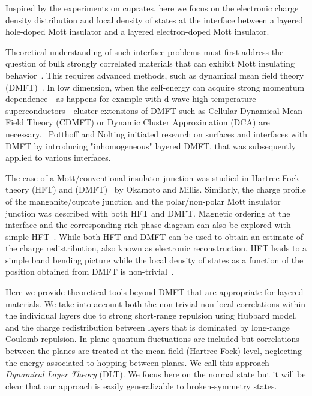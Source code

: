 \documentclass[twocolumn, preprintnumbers,prb,aps,amssymb,showpacs]{revtex4}
\begin{document}
Inspired by the experiments on cuprates, here we focus on the electronic charge density distribution and local density of states at the interface between a layered hole-doped Mott insulator and a layered electron-doped Mott insulator. 

Theoretical understanding of such interface problems must first address the question of bulk strongly correlated materials that can exhibit Mott insulating behavior~\cite{imada_metal-insulator_1998}. This requires advanced methods, such as dynamical mean field theory (DMFT)~\cite{georges_dynamical_1996}.  In low dimension, when the self-energy can acquire strong momentum dependence - as happens for example with d-wave high-temperature superconductors - cluster extensions of DMFT such as Cellular Dynamical Mean-Field Theory (CDMFT) or Dynamic Cluster Approximation (DCA) are necessary.~\cite{Hettler:1998,kotliar_cellular_2001,maier_quantum_2005,kotliar_electronic_2006,LTP:2006,SenechalMancini:2011} Potthoff and Nolting \cite{potthoff_surface_1999} initiated research on surfaces and interfaces with DMFT by introducing "inhomogeneous" layered DMFT, that was subsequently applied to various interfaces.~\cite{potthoff_metallic_1999,helmes_kondo_2008,zenia_appearance_2009} 

The case of a Mott/conventional insulator junction was studied in Hartree-Fock theory (HFT) \cite{okamoto_electronic_2004,okamoto_theory_2004} and (DMFT)~\cite{okamoto_spatial_2004,okamoto_interface_2005} by Okamoto and Millis. Similarly, the charge profile of the manganite/cuprate junction \cite{yunoki_electron_2007} and the polar/non-polar Mott insulator junction \cite{lee_electronic_2007} was described with both HFT and DMFT. Magnetic ordering at the interface and the corresponding rich phase diagram can also be explored with simple HFT~\cite{okamoto_electronic_2004,okamoto_theory_2004,yunoki_electron_2007,ueda_electronic_2012-1}. While both HFT and DMFT can be used to obtain an estimate of the charge redistribution, also known as electronic reconstruction, HFT leads to a simple band bending picture while the local density of states as a function of the position obtained from DMFT is non-trivial~\cite{okamoto_spatial_2004,freericks_dynamical_2004,helmes_kondo_2008,zenia_appearance_2009}. 

Here we provide theoretical tools beyond DMFT that are appropriate for layered materials. We take into account both the non-trivial non-local correlations within the individual layers due to strong short-range repulsion using Hubbard model, and the charge redistribution between layers that is dominated by long-range Coulomb repulsion. In-plane quantum fluctuations are included but correlations between the planes are treated at the mean-field (Hartree-Fock) level, neglecting the energy associated to hopping between planes. We call this approach \textit{Dynamical Layer Theory} (DLT). We focus here on the normal state but it will be clear that our approach is easily generalizable to broken-symmetry states. 
\end{document}
